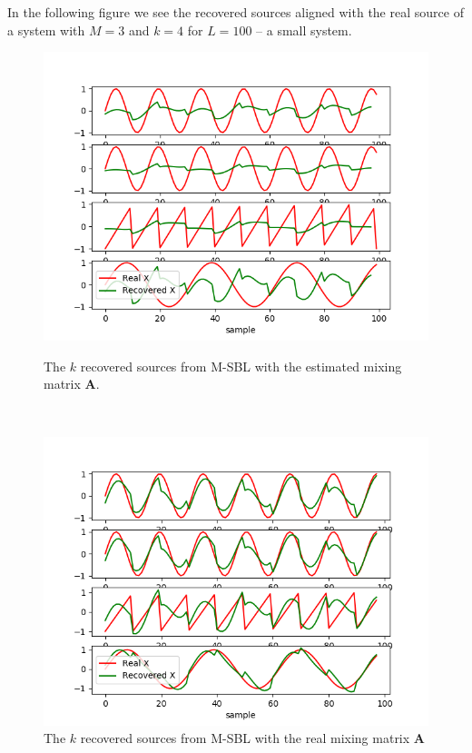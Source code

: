 In the following figure we see the recovered sources aligned with the real source of a system with $M = 3$ and $k = 4$ for $L = 100$ -- a small system.
\begin{figure}[H]
    \begin{minipage}{0.5\linewidth}
    	\centering
        \includegraphics[scale=0.5]{figures/chapter6/test_of_algo_mix_data.png}
		\caption{The $k$ recovered sources from M-SBL with the estimated mixing matrix $\mathbf{A}$.}
		\label{fig:test_toy}
    \end{minipage} 
    ~\hfill~
    \begin{minipage}{0.5\linewidth}
    	\centering
        \includegraphics[scale=0.5]{figures/chapter6/test_of_algo_mix_data_realA.png}
		\caption{The $k$ recovered sources from M-SBL with the real mixing matrix $\mathbf{A}$}
		\label{fig:test_toy_realA}
    \end{minipage}
\end{figure}
